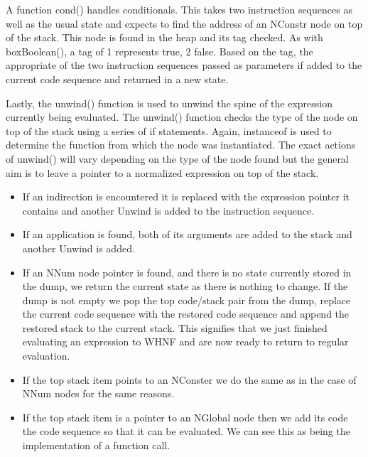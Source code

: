 A function cond() handles conditionals. This takes two instruction
sequences as well as the usual state and expects to find the address
of an NConstr node on top of the stack. This node is found in the
heap and its tag checked. As with boxBoolean(), a tag of 1 represents
true, 2 false. Based on the tag, the appropriate of the two instruction
sequences passed as parameters if added to the current code sequence
and returned in a new state.

Lastly, the unwind() function is used to unwind the spine of the
expression currently being evaluated. The unwind() function checks
the type of the node on top of the stack using a series of if
statements. Again, instanceof is used to determine the function
from which the node was instantiated. The exact actions of unwind()
will vary depending on the type of the node found but the general
aim is to leave a pointer to a normalized expression on top of
the stack. 

\begin{itemize}

\item If an indirection is encountered it is replaced with the
expression pointer it contains and another Unwind is added to the
instruction sequence. 

\item If an application is found, both of its
arguments are added to the stack and another Unwind is added. 

\item If
an NNum node pointer is found, and there is no state currently
stored in the dump, we return the current state as there is nothing
to change. If the dump is not empty we pop the top code/stack pair
from the dump, replace the current code sequence with the restored
code sequence and append the restored stack to the current stack. 
This signifies that we just finished evaluating an expression to
WHNF and are now ready to return to regular evaluation.

\item If the top stack item points to an NConster we do the same
as in the case of NNum nodes for the same reasons.

\item If the top stack item is a pointer to an NGlobal node 
then we add its code the code sequence so that it can be evaluated.
We can see this as being the implementation of a function call.

\end{itemize}

